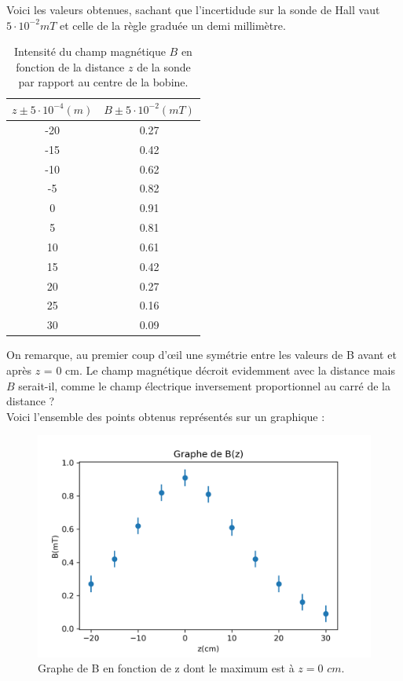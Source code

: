 \documentclass[12pt,a4paper]{article}
\begin{document}
Voici les valeurs obtenues, sachant que l'incertidude sur la sonde de Hall vaut $5\cdot10^{-2} mT$ et celle de la règle graduée un demi millimètre.
\begin{table}[H]
\begin{center}
\begin{tabular}{|c|c|}
\hline
$z \pm 5\cdot10^{-4} (m)$ & $B\pm 5\cdot10^{-2} (mT)$\\ 
\hline
-20 & 0.27 \\
\hline
-15 & 0.42 \\
\hline
-10 & 0.62 \\
\hline
-5 & 0.82\\
\hline
0 & 0.91\\
\hline
5 & 0.81\\
\hline
10 & 0.61\\
\hline
15 & 0.42\\
\hline
20 & 0.27\\
\hline
25 & 0.16\\
\hline
30 & 0.09\\
\hline
\end{tabular}
\caption{Intensité du champ magnétique $B$ en fonction de la distance $z$ de la sonde par rapport au centre de la bobine.}
\end{center}
\end{table}
On remarque, au premier coup d'œil une symétrie entre les valeurs de B avant et après $z$ = 0 cm. Le champ magnétique décroit evidemment avec la distance mais $B$ serait-il, comme le champ électrique inversement proportionnel au carré de la distance ?\\
Voici l'ensemble des points obtenus représentés sur un graphique :\\
\begin{figure}[H]
\begin{center}
\includegraphics[scale=1]{bz.png}
\caption{Graphe de B en fonction de z dont le maximum est à $z = 0$ $cm$.}
\end{center}
\end{figure}
\end{document}

